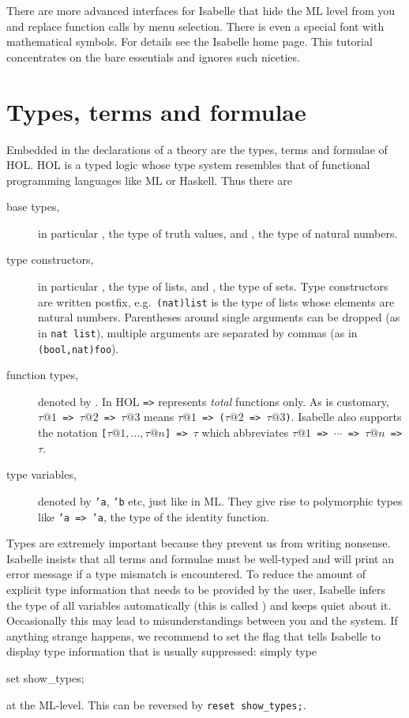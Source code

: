There are more advanced interfaces for Isabelle that hide the ML level from
you and replace function calls by menu selection. There is even a special
font with mathematical symbols. For details see the Isabelle home page.  This
tutorial concentrates on the bare essentials and ignores such niceties.

\section{Types, terms and formulae}
\label{sec:TypesTermsForms}

Embedded in the declarations of a theory are the types, terms and formulae of
HOL. HOL is a typed logic whose type system resembles that of functional
programming languages like ML or Haskell. Thus there are
\begin{description}
\item[base types,] in particular , the type of truth values,
and , the type of natural numbers.
\item[type constructors,] in particular , the type of
lists, and , the type of sets. Type constructors are written
postfix, e.g.\ \texttt{(nat)list} is the type of lists whose elements are
natural numbers. Parentheses around single arguments can be dropped (as in
\texttt{nat list}), multiple arguments are separated by commas (as in
\texttt{(bool,nat)foo}).
\item[function types,] denoted by \ttindexbold{=>}. In HOL
\texttt{=>} represents {\em total} functions only. As is customary,
\texttt{$\tau@1$ => $\tau@2$ => $\tau@3$} means
\texttt{$\tau@1$ => ($\tau@2$ => $\tau@3$)}. Isabelle also supports the
notation \texttt{[$\tau@1,\dots,\tau@n$] => $\tau$} which abbreviates
\texttt{$\tau@1$ => $\cdots$ => $\tau@n$ => $\tau$}.
\item[type variables,] denoted by \texttt{'a}, \texttt{'b} etc, just like in
ML. They give rise to polymorphic types like \texttt{'a => 'a}, the type of the
identity function.
\end{description}
\begin{warn}
  Types are extremely important because they prevent us from writing
  nonsense.  Isabelle insists that all terms and formulae must be well-typed
  and will print an error message if a type mismatch is encountered. To
  reduce the amount of explicit type information that needs to be provided by
  the user, Isabelle infers the type of all variables automatically (this is
  called ) and keeps quiet about it. Occasionally
  this may lead to misunderstandings between you and the system. If anything
  strange happens, we recommend to set the flag  that
  tells Isabelle to display type information that is usually suppressed:
  simply type
\begin{ttbox}
set show_types;
\end{ttbox}

\noindent
at the ML-level. This can be reversed by \texttt{reset show_types;}.
\end{warn}


